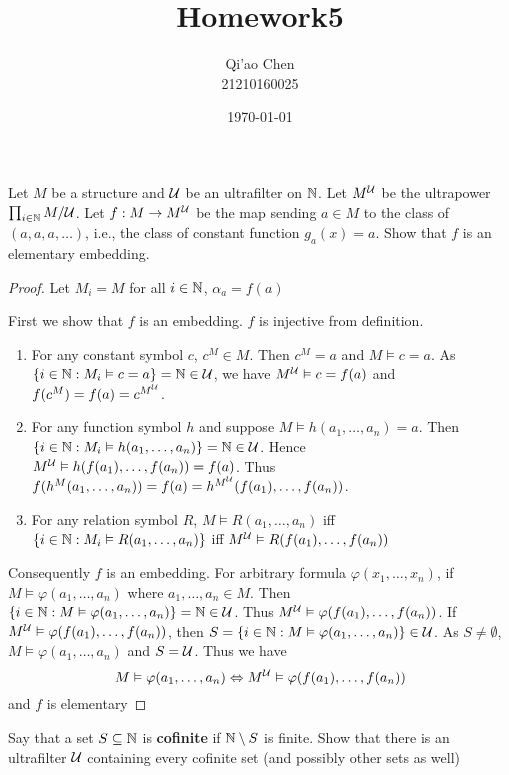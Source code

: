 \documentclass[11pt]{article}
\author{Qi'ao Chen\\21210160025}
\date{\today}
\title{Homework5}
\begin{document}
\maketitle
\begin{exercise}
Let \(M\) be a structure and \(\mathcal{U}\) be an ultrafilter on \(\mathbb{N}\). Let \(M^{\mathcal{U}}\) be the
ultrapower \(\prod_{i\in\mathbb{N}}M/\mathcal{U}\). Let \(f:M\to M^{\mathcal{U}}\) be the map sending \(a\in M\) to the class
of \((a,a,a,\dots)\), i.e., the class of constant function \(g_a(x)=a\). Show that \(f\) is an elementary
embedding.
\end{exercise}

\begin{proof}
Let \(M_i=M\) for all \(i\in\mathbb{N}\), \(\alpha_a=f(a)\)


First we show that \(f\) is an embedding. \(f\) is injective from definition.

\begin{enumerate}
\item For any constant symbol \(c\), \(c^M\in M\). Then \(c^M=a\) and \(M\vDash c=a\). As \(\{i\in\mathbb{N}:M_i\vDash c=a\}=\mathbb{N}\in\mathcal{U}\),
we have \(M^{\mathcal{U}}\vDash c=f(a)\) and \(f(c^M)=f(a)=c^{M^{\mathcal{U}}}\).
\item For any function symbol \(h\) and suppose \(M\vDash h(a_1,\dots,a_n)=a\).
Then \(\{i\in\mathbb{N}:M_i\vDash h(a_1,\dots,a_n)\}=\mathbb{N}\in\mathcal{U}\). Hence \(M^{\mathcal{U}}\vDash h(f(a_1),\dots,f(a_n))=f(a)\). Thus
\(f(h^M(a_1,\dots,a_n))=f(a)=h^{M^{\mathcal{U}}}(f(a_1),\dots,f(a_n))\).
\item For any relation symbol \(R\), \(M\vDash R(a_1,\dots,a_n)\) iff \(\{i\in\mathbb{N}:M_i\vDash R(a_1,\dots,a_n)\}\)
iff \(M^{\mathcal{U}}\vDash R(f(a_1),\dots,f(a_n))\)
\end{enumerate}


Consequently \(f\) is an embedding. For arbitrary formula \(\varphi(x_1,\dots,x_n)\), if \(M\vDash\varphi(a_1,\dots,a_n)\) where \(a_1,\dots,a_n\in M\).
Then \(\{i\in\mathbb{N}:M\vDash\varphi(a_1,\dots,a_n)\}=\mathbb{N}\in\mathcal{U}\). Thus \(M^{\mathcal{U}}\vDash\varphi(f(a_1),\dots,f(a_n))\). If \(M^{\mathcal{U}}\vDash\varphi(f(a_1),\dots,f(a_n))\),
then \(S=\{i\in\mathbb{N}:M\vDash\varphi(a_1,\dots,a_n)\}\in\mathcal{U}\). As \(S\neq\emptyset\), \(M\vDash\varphi(a_1,\dots,a_n)\) and \(S=\mathcal{U}\). Thus we have
\begin{equation*}
M\vDash\varphi(a_1,\dots,a_n)\Leftrightarrow M^{\mathcal{U}}\vDash\varphi(f(a_1),\dots,f(a_n))
\end{equation*}
and \(f\) is elementary
\end{proof}

\begin{exercise}[2]
Say that a set \(S\subseteq\mathbb{N}\) is \textbf{cofinite} if \(\mathbb{N}\setminus S\) is finite. Show that there is an ultrafilter \(\mathcal{U}\)
containing every cofinite set (and possibly other sets as well)
\end{exercise}
\end{document}
